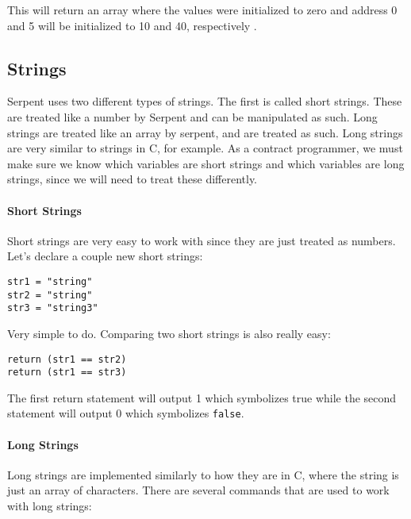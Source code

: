 \documentclass[12pt]{article}
\begin{document}
This will return an array where the values were initialized to zero and address 0 and 5 will be initialized to 10 and 40, respectively \cite{Serpent}. 

\subsection{Strings}
	Serpent uses two different types of strings. The first is called short strings. These are treated like a number by Serpent and can be manipulated as such. Long strings are treated like an array by serpent, and are treated as such. Long strings are very similar to strings in C, for example. As a contract programmer, we must make sure we know which variables are short strings and which variables are long strings, since we will need to treat these differently. \cite{Serpent}

\paragraph{Short Strings}
	Short strings are very easy to work with since they are just treated as numbers. Let's declare a couple new short strings:
	
\begin{verbatim}
str1 = "string"
str2 = "string"
str3 = "string3"
\end{verbatim}

Very simple to do. Comparing two short strings is also really easy:

\begin{verbatim}
return (str1 == str2)
return (str1 == str3)
\end{verbatim}

The first return statement will output 1 which symbolizes true while the second statement will output 0 which symbolizes \texttt{false}. \cite{Serpent}

\paragraph{Long Strings}
Long strings are implemented similarly to how they are in C, where the string is just an array of characters. There are several commands that are used to work with long strings:
\end{document}
